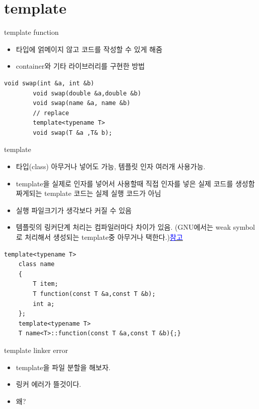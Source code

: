 \documentclass[10pt]{beamer}
\begin{document}
\section{template}

\begin{frame}[fragile]{template function}
    \begin{itemize}
        \item 타입에 얽메이지 않고 코드를 작성할 수 있게 해줌
        \item container와 기타 라이브러리를 구현한 방법
    \end{itemize}    
    \begin{lstlisting}[style = CppStyle]
        void swap(int &a, int &b)
        void swap(double &a,double &b)
        void swap(name &a, name &b)
        // replace
        template<typename T>
        void swap(T &a ,T& b);
    \end{lstlisting}
\end{frame}    

    
\begin{frame}{template}
    \begin{itemize}
        \item 타입(class) 아무거나 넣어도 가능, 템플릿 인자 여러개 사용가능.
        \item template을 실제로 인자를 넣어서 사용할때 직접 인자를 넣은 실제 코드를 생성함 짜게되는 template 코드는 실제 실행 코드가 아님
        \item 실행 파일크기가 생각보다 커질 수 있음
        \item 템플릿의 링커단계 처리는 컴파일러마다 차이가 있음. (GNU에서는 weak symbol로 처리해서 생성되는 template중 아무거나 택한다.)\href{https://stackoverflow.com/questions/44335046/how-does-the-linker-handle-identical-template-instantiations-across-translation}{\textcolor{blue}{참고}}
    \end{itemize}
\end{frame}    

\begin{frame}[fragile]{}
    \begin{lstlisting}[style = CppStyle]
    template<typename T>
    class name
    {
        T item;
        T function(const T &a,const T &b);
        int a;
    };
    template<typename T>
    T name<T>::function(const T &a,const T &b){;}
    \end{lstlisting}
\end{frame}    

\begin{frame}{template linker error}
    \begin{itemize}
        \item template을 파일 분할을 해보자.
        \item 링커 에러가 뜰것이다.
        \item 왜?
    \end{itemize}
\end{frame}
\end{document}
